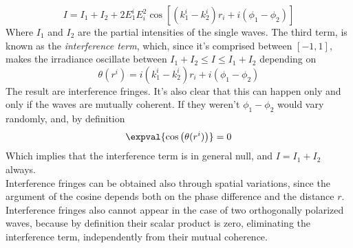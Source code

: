 \documentclass[../electromagnetism.tex]{subfiles}
\begin{document}
\begin{equation}
	I=I_1+I_2+2E^i_1E_i^2\cos\left[ \left( k_1^i-k_2^i \right)r_i+i(\phi_1-\phi_2) \right]
	\label{eq:irradianceinterference}
\end{equation}
Where $I_1$ and $I_2$ are the partial intensities of the single waves. The third term, is known as the \textit{interference term}, which, since it's comprised between $[-1,1]$, makes the irradiance oscillate between $I_1+I_2\le I \le I_1+I_2$ depending on
\begin{equation}
	\theta(r^i)=i(k_1^i-k_2^i)r_i+i(\phi_1-\phi_2)
	\label{eq:cosinterference}
\end{equation}
The result are interference fringes. It's also clear that this can happen only and only if the waves are mutually coherent. If they weren't $\phi_1-\phi_2$ would vary randomly, and, by definition
\begin{equation*}
	\expval{\cos\left( \theta(r^i) \right)}=0
\end{equation*}
Which implies that the interference term is in general null, and $I=I_1+I_2$ always.\\
Interference fringes can be obtained also through spatial variations, since the argument of the cosine depends both on the phase difference and the distance $r$.\\
Interference fringes also cannot appear in the case of two orthogonally polarized waves, because by definition their scalar product is zero, eliminating the interference term, independently from their mutual coherence.
\end{document}
